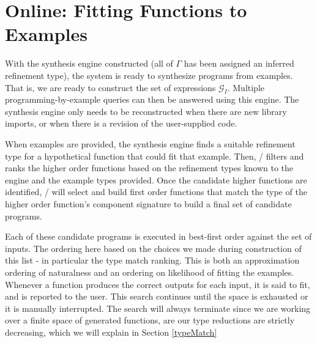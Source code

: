 \section{Online: Fitting Functions to Examples} \label{synth}

With the synthesis engine constructed (all of $\Gamma$ has been assigned an inferred refinement type), the system is ready to synthesize programs from examples.
That is, we are ready to construct the set of expressions $\mathcal{G}_I$.
Multiple programming-by-example queries can then be answered using this engine.
The synthesis engine only needs to be reconstructed when there are new library imports, or when there is a revision of the user-supplied code.

When examples are provided, the synthesis engine finds a suitable refinement type for a hypothetical function that could fit that example.
Then, \ourTool/ filters and ranks the higher order functions based on the refinement types known to the engine and the example types provided.
Once the candidate higher functions are identified, \ourTool/ will select and build first order functions that match the type of the higher order function's component signature to build a final set of candidate programs.

Each of these candidate programs is executed in best-first order against the set of inputs.
The ordering here based on the choices we made during construction of this list - in particular the type match ranking.
This is both an approximation ordering of naturalness and an ordering on likelihood of fitting the examples.
Whenever a function produces the correct outputs for each input, it is said to fit, and is reported to the user.
This search continues until the space is exhausted or it is manually interrupted.
The search will always terminate since we are working over a finite space of generated functions, are our type reductions are strictly decreasing, which we will explain in Section \ref{typeMatch}






